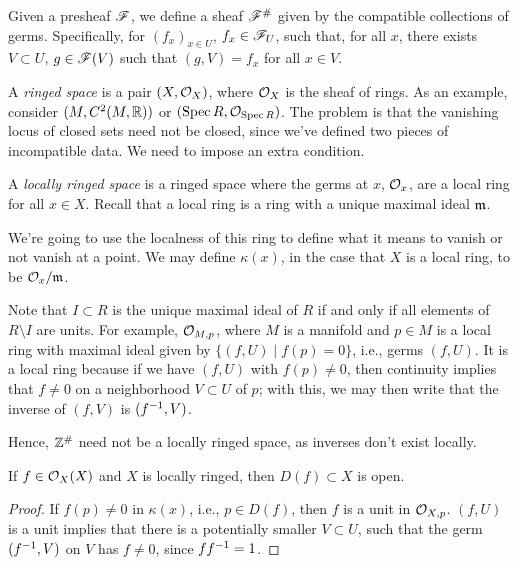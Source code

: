 Given a presheaf $\mathscr F$, we define a sheaf $\mathscr F^\#$ given by the compatible collections of germs. Specifically, for $(f_x)_{x \in U}$, $f_x \in \mathscr F_U$, such that, for all $x$, there exists $V \subset U$, $g \in \mathscr F(V)$ such that $(g, V) = f_x$ for all $x \in V$.

A \textit{ringed space} is a pair $(X, \mathcal O_X)$, where $\mathcal O_X$ is the sheaf of rings. As an example, consider $(M, C^2(M, \mathbb R))$ or $(\operatorname{Spec} R, \mathcal O_{\operatorname{Spec} R})$. The problem is that the vanishing locus of closed sets need not be closed, since we've defined two pieces of incompatible data. We need to impose an extra condition.
\begin{definition} \label{defn:locally_ringed_space}
    A \textit{locally ringed space} is a ringed space where the germs at $x$, $\mathcal O_x$, are a local ring for all $x \in X$. Recall that a local ring is a ring with a unique maximal ideal $\mathfrak m$.
\end{definition}
We're going to use the localness of this ring to define what it means to vanish or not vanish at a point. We may define $\kappa(x)$, in the case that $X$ is a local ring, to be $\mathcal O_x/\mathfrak m$.

Note that $I \subset R$ is the unique maximal ideal of $R$ if and only if all elements of $R \setminus I$ are units. For example, $\mathcal O_{M,p}$, where $M$ is a manifold and $p \in M$ is a local ring with maximal ideal given by $\{(f, U) \mid f(p) = 0\}$, i.e., germs $(f, U)$. It is a local ring because if we have $(f, U)$ with $f(p) \neq 0$, then continuity implies that $f \neq 0$ on a neighborhood $V \subset U$ of $p$; with this, we may then write that the inverse of $(f, V)$ is $(f^{-1}, V)$.

Hence, $\mathbb Z^\#$ need not be a locally ringed space, as inverses don't exist locally.

\begin{theorem} \label{thm:open_set_in_locally_ringed_space}
    If $f \in \mathcal O_X(X)$ and $X$ is locally ringed, then $D(f) \subset X$ is open. 
\end{theorem}
\begin{proof}
    If $f(p) \neq 0$ in $\kappa(x)$, i.e., $p \in D(f)$, then $f$ is a unit in $\mathcal O_{X,p}$. $(f, U)$ is a unit implies that there is a potentially smaller $V \subset U$, such that the germ $(f^{-1}, V)$ on $V$ has $f \neq 0$, since $f f^{-1} = 1$.
\end{proof}
